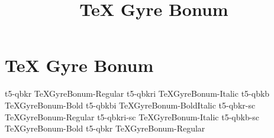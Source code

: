 \documentclass[sample]{vnsample}
\title{TeX Gyre Bonum}
\begin{document}
\section{TeX Gyre Bonum}
    {t5-qbkr}     {TeXGyreBonum-Regular}
   {t5-qbkri}    {TeXGyreBonum-Italic}
    {t5-qbkb}     {TeXGyreBonum-Bold}
   {t5-qbkbi}    {TeXGyreBonum-BoldItalic}
   {t5-qbkr-sc}  {TeXGyreBonum-Regular}
 {t5-qbkri-sc} {TeXGyreBonum-Italic}
   {t5-qbkb-sc}  {TeXGyreBonum-Bold}
    {t5-qbkr}     {TeXGyreBonum-Regular}
\end{document}
